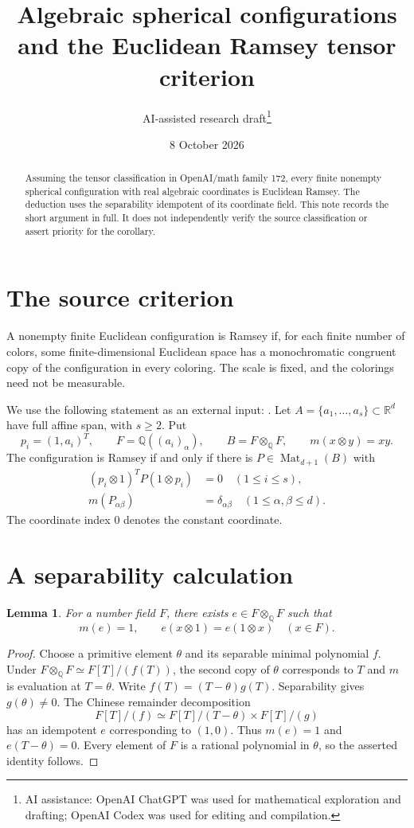 \documentclass[11pt,a4paper]{article}
\title{Algebraic spherical configurations\\and the Euclidean Ramsey tensor criterion}
\author{AI-assisted research draft\thanks{AI assistance: OpenAI ChatGPT was used for mathematical exploration and drafting; OpenAI Codex was used for editing and compilation.}}
\date{8 October 2026}
\newtheorem{lemma}{Lemma}
\newcommand{\Q}{\mathbb Q}
\begin{document}
\maketitle
\begin{abstract}
Assuming the tensor classification in OpenAI/math family 172, every finite nonempty spherical configuration with real algebraic coordinates is Euclidean Ramsey. The deduction uses the separability idempotent of its coordinate field. This note records the short argument in full. It does not independently verify the source classification or assert priority for the corollary.
\end{abstract}

\section{The source criterion}
A nonempty finite Euclidean configuration is Ramsey if, for each finite number of colors, some finite-dimensional Euclidean space has a monochromatic congruent copy of the configuration in every coloring. The scale is fixed, and the colorings need not be measurable.

We use the following statement as an external input: \cite[Theorem 1.1]{source}. Let $A=\{a_1,\ldots,a_s\}\subset\mathbb R^d$ have full affine span, with $s\ge2$. Put
\[
 p_i=(1,a_i)^T,\qquad F=\Q((a_i)_\alpha),\qquad B=F\otimes_\Q F,
 \qquad m(x\otimes y)=xy.
\]
The configuration is Ramsey if and only if there is $P\in\operatorname{Mat}_{d+1}(B)$ with
\begin{align}
 (p_i\otimes1)^TP(1\otimes p_i)&=0\quad(1\le i\le s),\label{evaluation}\\
 m(P_{\alpha\beta})&=\delta_{\alpha\beta}\quad(1\le\alpha,\beta\le d).\label{metric}
\end{align}
The coordinate index $0$ denotes the constant coordinate.

\section{A separability calculation}
\begin{lemma}
For a number field $F$, there exists $e\in F\otimes_\Q F$ such that
\[
 m(e)=1,\qquad e(x\otimes1)=e(1\otimes x)\quad(x\in F).
\]
\end{lemma}
\begin{proof}
Choose a primitive element $\theta$ and its separable minimal polynomial $f$. Under $F\otimes_\Q F\simeq F[T]/(f(T))$, the second copy of $\theta$ corresponds to $T$ and $m$ is evaluation at $T=\theta$. Write $f(T)=(T-\theta)g(T)$. Separability gives $g(\theta)\ne0$. The Chinese remainder decomposition
\[
 F[T]/(f)\simeq F[T]/(T-\theta)\times F[T]/(g)
\]
has an idempotent $e$ corresponding to $(1,0)$. Thus $m(e)=1$ and $e(T-\theta)=0$. Every element of $F$ is a rational polynomial in $\theta$, so the asserted identity follows.
\end{proof}
\end{document}
